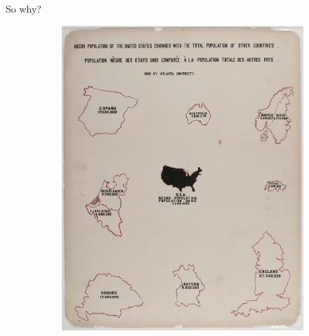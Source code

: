 \documentclass[xcolor={dvipsnames}, handout]{beamer}
\begin{document}
\begin{frame}{So why?}
\begin{figure}[H]
\begin{subfigure}{.24\textwidth}
            \includegraphics[width=1\textwidth]{figures/intro/du_bois_country.png}
            \caption{}
            \label{fig:intro_dbc}
        \end{subfigure}
        \begin{subfigure}{.24\textwidth}

\end{subfigure}
\end{figure}
\end{frame}
\end{document}
